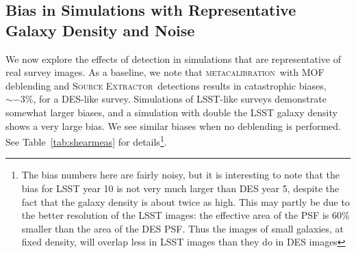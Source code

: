 \documentclass[fleqn,useAMS,usenatbib]{mnras}
\newcommand{\snr}{$S/N$}
\newcommand{\mcal}{\textsc{metacalibration}}
\newcommand{\sx}{\textsc{Source Extractor}}
\begin{document}
%
%

\subsection{Bias in Simulations with Representative Galaxy Density and Noise}

We now explore the effects of detection in simulations that are representative
of real survey images. As a baseline, we note that \mcal\ with MOF deblending
and \sx\ detections results in catastrophic biases, $\sim-3\%$, for a DES-like
survey. Simulations of LSST-like surveys demonstrate somewhat larger biases,
and a simulation with double the LSST galaxy density shows a very large bias.
We see similar biases when no deblending is performed.  See
Table~\ref{tab:shearmeas} for details\footnote{The bias numbers here are fairly
noisy, but it is interesting to note that the bias for LSST year 10 is not very
much larger than DES year 5, despite the fact that the galaxy density is about
twice as high.  This may partly be due to the better resolution of the LSST
images: the effective area of the PSF is 60\% smaller than the area of the DES
PSF.  Thus the images of small galaxies, at fixed density, will overlap less in
LSST images than they do in DES images}.
\end{document}
